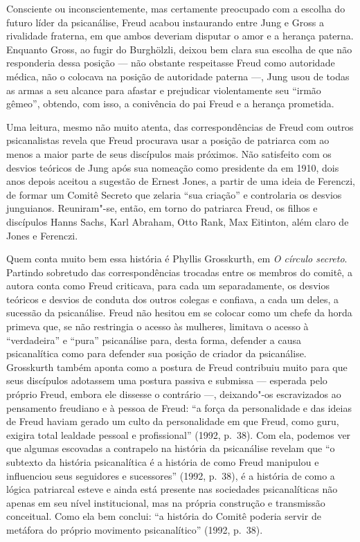 Consciente ou inconscientemente, mas certamente preocupado com a escolha
do futuro líder da psicanálise, Freud acabou instaurando entre Jung e
Gross a rivalidade fraterna, em que ambos deveriam disputar o amor e a
herança paterna. Enquanto Gross, ao fugir do Burghölzli, deixou bem
clara sua escolha de que não responderia dessa posição --- não obstante
respeitasse Freud como autoridade médica, não o colocava na posição de
autoridade paterna ---, Jung usou de todas as armas a seu alcance para
afastar e prejudicar violentamente seu ``irmão gêmeo'', obtendo, com
isso, a conivência do pai Freud e a herança prometida.

Uma leitura, mesmo não muito atenta, das correspondências de Freud com
outros psicanalistas revela que Freud procurava usar a posição de
patriarca com ao menos a maior parte de seus discípulos mais próximos.
Não satisfeito com os desvios teóricos de Jung após sua nomeação como
presidente da  em 1910, dois anos depois aceitou a sugestão de Ernest
Jones, a partir de uma ideia de Ferenczi, de formar um Comitê Secreto
que zelaria ``sua criação'' e controlaria os desvios junguianos.
Reuniram"-se, então, em torno do patriarca Freud, os filhos e discípulos
Hanns Sachs, Karl Abraham, Otto Rank, Max Eitinton, além claro de Jones
e Ferenczi.

Quem conta muito bem essa história é Phyllis Grosskurth, em \emph{O
círculo secreto}. Partindo sobretudo das correspondências trocadas
entre os membros do comitê, a autora conta como Freud criticava, para
cada um separadamente, os desvios teóricos e desvios de conduta dos
outros colegas e confiava, a cada um deles, a sucessão da psicanálise.
Freud não hesitou em se colocar como um chefe da horda primeva que, se
não restringia o acesso às mulheres, limitava o acesso à ``verdadeira''
e ``pura'' psicanálise para, desta forma, defender a causa psicanalítica
como para defender sua posição de criador da psicanálise. Grosskurth
também aponta como a postura de Freud contribuiu muito para que seus
discípulos adotassem uma postura passiva e submissa --- esperada pelo
próprio Freud, embora ele dissesse o contrário ---, deixando"-os
escravizados ao pensamento freudiano e à pessoa de Freud: ``a força da
personalidade e das ideias de Freud haviam gerado um culto da
personalidade em que Freud, como guru, exigira total lealdade pessoal e
profissional'' (1992, p.~38). Com ela, podemos ver que algumas escovadas a contrapelo
na história da psicanálise revelam que ``o subtexto da história
psicanalítica é a história de como Freud manipulou e influenciou seus
seguidores e sucessores'' (1992, p.~38), é a história de como a lógica
patriarcal esteve e ainda está presente nas sociedades psicanalíticas
não apenas em seu nível institucional, mas na própria construção e
transmissão conceitual. Como ela bem conclui: ``a história do Comitê
poderia servir de metáfora do próprio movimento psicanalítico''
(1992, p.~38).

